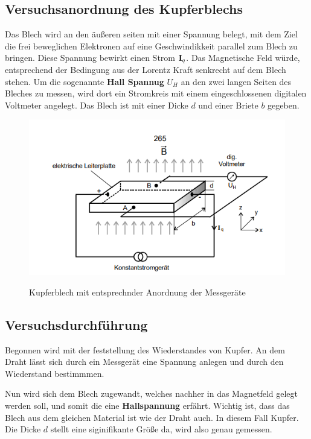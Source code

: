 \subsection{Versuchsanordnung des Kupferblechs}
\label{sec:Blech}
Das Blech wird an den äußeren seiten mit einer Spannung belegt, mit dem Ziel die frei beweglichen Elektronen auf eine Geschwindikkeit parallel zum 
Blech zu bringen. Diese Spannung bewirkt einen Strom $\text{\textbf{I}}_q$. Das Magnetische Feld würde, entsprechend der Bedingung aus der Lorentz Kraft %
senkrecht auf dem Blech stehen. Um die sogenannte \textbf{Hall Spannug} $U_H$ an den zwei langen Seiten des Bleches zu messen, wird dort ein Stromkreis
mit einem eingeschlossenen digitalen Voltmeter angelegt. Das Blech ist mit einer Dicke $d$ und einer Briete $b$ gegeben.

\begin{figure}
     \centering
     \includegraphics[width=\textwidth]{bilder/versuchsanordnung.png}
     \caption{Kupferblech mit entsprechnder Anordnung der Messgeräte}
     \cite[9]{V311.pdf}
     \label{fig:kupferblech}
\end{figure}

\subsection{Versuchsdurchführung}
Begonnen wird mit der feststellung des Wiederstandes von Kupfer. An dem Draht lässt sich durch ein Messgerät eine Spannung anlegen und durch %
den Wiederstand bestimmmen. \\ \flushleft

Nun wird sich dem Blech zugewandt, welches nachher in das Magnetfeld gelegt werden soll, und somit die eine \textbf{Hallspannung} erfährt.
Wichtig ist, dass das Blech aus dem gleichen Material ist wie der Draht auch. In diesem Fall Kupfer. Die Dicke $d$ stellt eine siginifikante Größe da, wird also genau gemessen.\\ \flushleft


